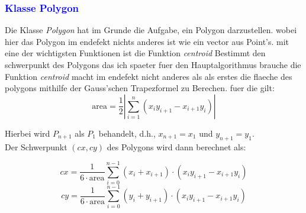 \documentclass{article}
\begin{document}
\subsubsection{\textcolor{blue}{Klasse Polygon}}
\begin{center}
Die Klasse \textit{Polygon} hat im Grunde die Aufgabe, ein Polygon darzustellen. wobei hier das Polygon im endefekt nichts anderes ist wie ein vector aus Point's. mit eine der wichtigsten Funktionen ist die Funktion \textit{centroid} Bestimmt den schwerpunkt des Polygons das ich spaeter fuer den Hauptalgorithmus brauche die Funktion \textit{centroid} macht im endefekt nicht anderes als als erstes die flaeche des polygons mithilfe der Gauss'schen Trapezformel zu Berechen. fuer die gilt:
\[
\text{area} = \frac{1}{2} \left| \sum_{i=1}^{n} (x_i y_{i+1} - x_{i+1} y_i) \right|
\]

Hierbei wird $P_{n+1}$ als $P_1$ behandelt, d.h., $x_{n+1} = x_1$ und $y_{n+1} = y_1$.
\\
Der Schwerpunkt $(cx, cy)$ des Polygons wird dann berechnet als:

\[
cx = \frac{1}{6 \cdot \text{area}} \sum_{i=0}^{n-1} (x_i + x_{i+1}) \cdot (x_i y_{i+1} - x_{i+1} y_i)
\]
\[
cy = \frac{1}{6 \cdot \text{area}} \sum_{i=0}^{n-1} (y_i + y_{i+1}) \cdot (x_i y_{i+1} - x_{i+1} y_i)
\]


\end{center}
\end{document}
